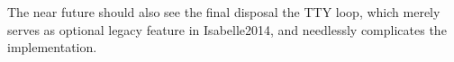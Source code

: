 \begin{isabellebody}
\begin{isamarkuptext}
\begin{itemize}
\end{itemize}

The near future should also see the final disposal the TTY loop, which
merely serves as optional legacy feature in Isabelle2014, and needlessly
complicates the implementation.%
\end{isamarkuptext}%
\isamarkuptrue%
%
\isadelimtheory
%
\endisadelimtheory
%
\isatagtheory
{}\isamarkupfalse%
%
\endisatagtheory
{\isafoldtheory}%
%
\isadelimtheory
%
\endisadelimtheory
\isanewline
\end{isabellebody}%
